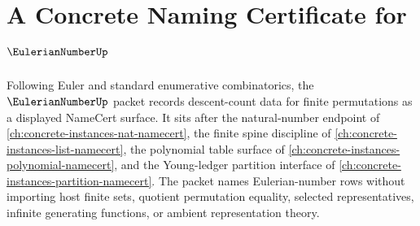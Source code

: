 \chapter{A Concrete Naming Certificate for $\EulerianNumberUp$}
\label{ch:concrete-instances-eulerian-number-namecert}

Following Euler and standard enumerative combinatorics, the $\EulerianNumberUp$ packet records descent-count data for finite permutations as a displayed NameCert surface. It sits after the natural-number endpoint of \autoref{ch:concrete-instances-nat-namecert}, the finite spine discipline of \autoref{ch:concrete-instances-list-namecert}, the polynomial table surface of \autoref{ch:concrete-instances-polynomial-namecert}, and the Young-ledger partition interface of \autoref{ch:concrete-instances-partition-namecert}. The packet names Eulerian-number rows without importing host finite sets, quotient permutation equality, selected representatives, infinite generating functions, or ambient representation theory.

